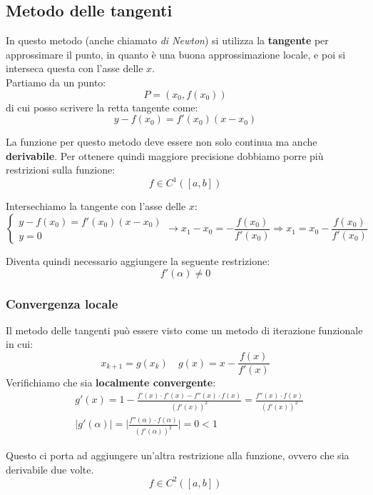 \subsection{Metodo delle tangenti}
In questo metodo (anche chiamato \textit{di Newton}) si utilizza la \textbf{tangente} per approssimare il punto, in quanto è una buona approssimazione locale, e poi si interseca questa con l'asse delle $x$.\\
Partiamo da un punto:
\begin{equation*}
	P=(x_0,f(x_0))
\end{equation*}
di cui posso scrivere la retta tangente come:
\begin{equation*}
	y-f(x_0)=f'(x_0)(x-x_0)
\end{equation*}
\begin{note}
	La funzione per questo metodo deve essere non solo continua ma anche \textbf{derivabile}. Per ottenere quindi maggiore precisione dobbiamo porre più restrizioni sulla funzione:
	\begin{equation*}
		f \in C^1([a,b])
	\end{equation*}
\end{note}
\noindent Intersechiamo la tangente con l'asse delle $x$:
\begin{equation*}
	\begin{cases}
		y-f(x_0)=f'(x_0)(x-x_0) \\
		y=0
	\end{cases} \to 
	x_1-x_0 = -\frac{f(x_0)}{f'(x_0)} \Rightarrow x_1 = x_0 -\frac{f(x_0)}{f'(x_0)}
\end{equation*}
\begin{note}
	Diventa quindi necessario aggiungere la seguente restrizione:
	\begin{equation*}
		f'(\alpha) \neq 0
	\end{equation*}
\end{note}

\subsubsection{Convergenza locale}
Il metodo delle tangenti può essere visto come un metodo di iterazione funzionale in cui:
\begin{equation*}
	x_{k+1}=g(x_k) \quad g(x)=x-\frac{f(x)}{f'(x)}
\end{equation*}
Verifichiamo che sia \textbf{localmente convergente}:
\begin{align*}
	& g'(x)=1 - \frac{f'(x) \cdot f'(x) - f''(x) \cdot f(x)}{(f'(x))^2} = \frac{f''(x) \cdot f(x)}{(f'(x))^2} \\
	& \lvert g'(\alpha) \rvert = \lvert  \frac{f''(\alpha) \cdot f(\alpha)}{(f'(\alpha))^2} \rvert = 0 < 1
\end{align*}
\begin{note}
	Questo ci porta ad aggiungere un'altra restrizione alla funzione, ovvero che sia derivabile due volte.
	\begin{equation*}
		f \in C^2([a,b])
	\end{equation*}
\end{note}

